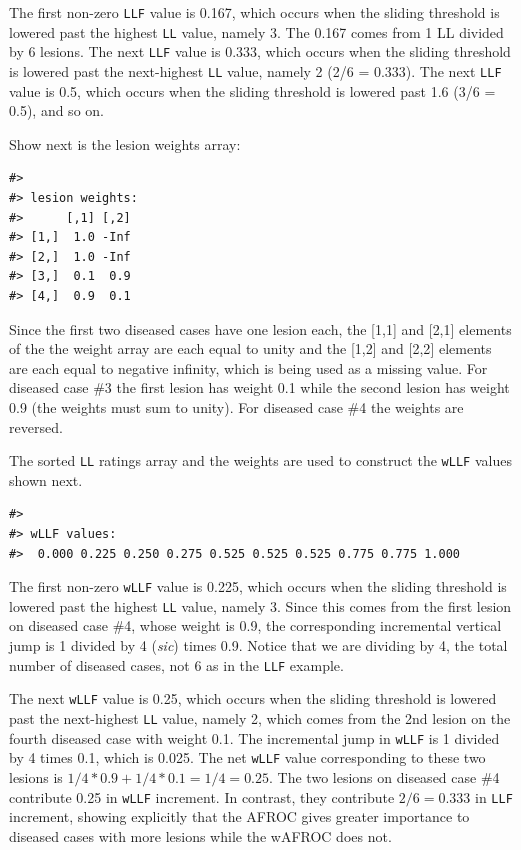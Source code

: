 \documentclass[
]{book}
\begin{document}
The first non-zero \texttt{LLF} value is 0.167, which occurs when the sliding threshold is lowered past the highest \texttt{LL} value, namely 3. The 0.167 comes from 1 LL divided by 6 lesions. The next \texttt{LLF} value is 0.333, which occurs when the sliding threshold is lowered past the next-highest \texttt{LL} value, namely 2 (2/6 = 0.333). The next \texttt{LLF} value is 0.5, which occurs when the sliding threshold is lowered past 1.6 (3/6 = 0.5), and so on.

Show next is the lesion weights array:

\begin{verbatim}
#> 
#> lesion weights:
#>      [,1] [,2]
#> [1,]  1.0 -Inf
#> [2,]  1.0 -Inf
#> [3,]  0.1  0.9
#> [4,]  0.9  0.1
\end{verbatim}

Since the first two diseased cases have one lesion each, the {[}1,1{]} and {[}2,1{]} elements of the the weight array are each equal to unity and the {[}1,2{]} and {[}2,2{]} elements are each equal to negative infinity, which is being used as a missing value. For diseased case \#3 the first lesion has weight 0.1 while the second lesion has weight 0.9 (the weights must sum to unity). For diseased case \#4 the weights are reversed.

The sorted \texttt{LL} ratings array and the weights are used to construct the \texttt{wLLF} values shown next.

\begin{verbatim}
#> 
#> wLLF values:
#>  0.000 0.225 0.250 0.275 0.525 0.525 0.525 0.775 0.775 1.000
\end{verbatim}

The first non-zero \texttt{wLLF} value is 0.225, which occurs when the sliding threshold is lowered past the highest \texttt{LL} value, namely 3. Since this comes from the first lesion on diseased case \#4, whose weight is 0.9, the corresponding incremental vertical jump is 1 divided by 4 (\emph{sic}) times 0.9. Notice that we are dividing by 4, the total number of diseased cases, not 6 as in the \texttt{LLF} example.

The next \texttt{wLLF} value is 0.25, which occurs when the sliding threshold is lowered past the next-highest \texttt{LL} value, namely 2, which comes from the 2nd lesion on the fourth diseased case with weight 0.1. The incremental jump in \texttt{wLLF} is 1 divided by 4 times 0.1, which is 0.025. The net \texttt{wLLF} value corresponding to these two lesions is \(1/4*0.9 + 1/4*0.1 = 1/4 = 0.25\). The two lesions on diseased case \#4 contribute 0.25 in \texttt{wLLF} increment. In contrast, they contribute \(2/6 = 0.333\) in \texttt{LLF} increment, showing explicitly that the AFROC gives greater importance to diseased cases with more lesions while the wAFROC does not.
\end{document}
